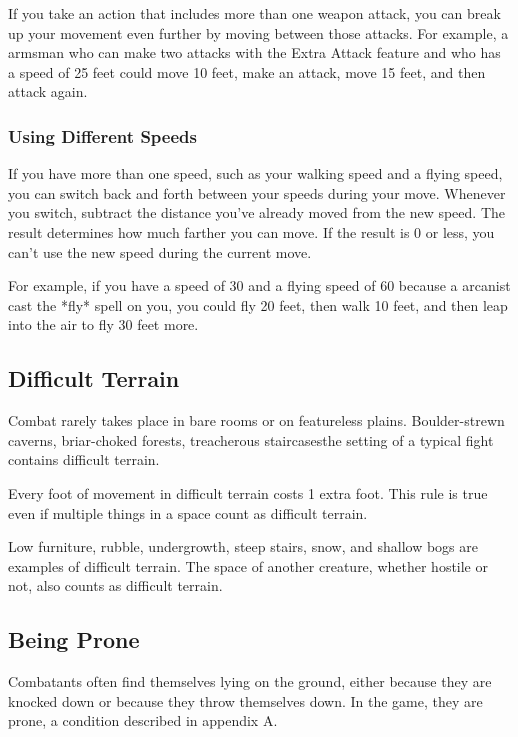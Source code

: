 If you take an action that includes more than one weapon attack, you can break up your movement even further by moving between those attacks. For example, a armsman who can make two attacks with the Extra Attack feature and who has a speed of 25 feet could move 10 feet, make an attack, move 15 feet, and then attack again.

\subsubsection{Using Different Speeds}

If you have more than one speed, such as your walking speed and a flying speed, you can switch back and forth between your speeds during your move. Whenever you switch, subtract the distance you've already moved from the new speed. The result determines how much farther you can move. If the result is 0 or less, you can't use the new speed during the current move.

For example, if you have a speed of 30 and a flying speed of 60 because a arcanist cast the *fly* spell on you, you could fly 20 feet, then walk 10 feet, and then leap into the air to fly 30 feet more.

\subsection{Difficult Terrain}

Combat rarely takes place in bare rooms or on featureless plains. Boulder-strewn caverns, briar-choked forests, treacherous staircases\textemdash the setting of a typical fight contains difficult terrain.

Every foot of movement in difficult terrain costs 1 extra foot. This rule is true even if multiple things in a space count as difficult terrain.

Low furniture, rubble, undergrowth, steep stairs, snow, and shallow bogs are examples of difficult terrain. The space of another creature, whether hostile or not, also counts as difficult terrain.

\subsection{Being Prone}

Combatants often find themselves lying on the ground, either because they are knocked down or because they throw themselves down. In the game, they are prone, a condition described in appendix A.

